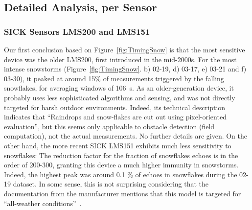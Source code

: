 \subsection{Detailed Analysis, per Sensor}

\subsubsection{SICK Sensors LMS200 and LMS151}
Our first conclusion based on Figure~\ref{fig:TimingSnow} is that the most sensitive device was the older LMS200, first introduced in the mid-2000s. For the most intense snowstorms (Figure~\ref{fig:TimingSnow}. b) 02-19, d) 03-17, e) 03-21 and f) 03-30), it peaked at around 15\% of measurements triggered by the falling snowflakes, for averaging windows of \SI{106}{\second}. As an older-generation device, it probably uses less sophisticated algorithms and sensing, and was not directly targeted for harsh outdoor environments. Indeed, its technical description~\citep{LMS200Manual} indicates that ``Raindrops and snow-flakes are cut out using pixel-oriented evaluation'', but this seems only applicable to obstacle detection (field computation), not the actual measurements. No further details are given. On the other hand, the more recent SICK LMS151 exhibits much less sensitivity to snowflakes: The reduction factor for the fraction of snowflakes echoes is in the order of 200-300, granting this device a much higher immunity in snowstorms. Indeed, the highest peak was around 0.1 \% of echoes in snowflakes during the 02-19 dataset. In some sense, this is not surprising considering that the documentation from the manufacturer mentions that this model is targeted for ``all-weather conditions''~\citep{LMS151Manual}.


